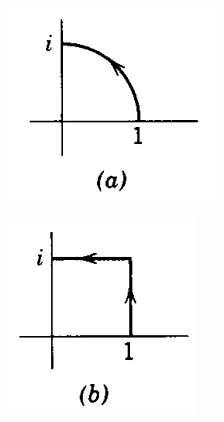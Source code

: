 \documentclass[10pt]{article}
\begin{document}
\begin{figure}[h]
	\centering
	\begin{subfigure}[b]{0.1\textwidth}
		\centering
		\includegraphics[width=\textwidth]{hw4-1}
	\end{subfigure}
	\begin{subfigure}[b]{0.1\textwidth}
		\centering
		\includegraphics[width=\textwidth]{hw4-2}
	\end{subfigure}
\end{figure}
\end{document}
